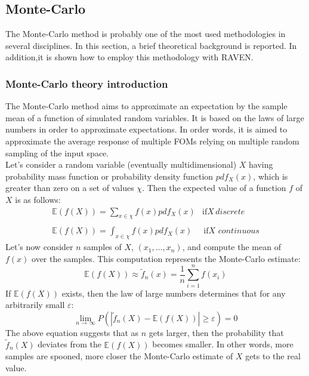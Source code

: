 \subsection{Monte-Carlo}
\label{sub:MC}
The Monte-Carlo method is probably one of the most used methodologies in several disciplines. In this section, a brief theoretical 
background is reported. In addition,it is shown how to employ this methodology with RAVEN.
\subsubsection{Monte-Carlo theory introduction}
\label{subsub:MCtheory}
The Monte-Carlo method aims to approximate an expectation by the sample mean of a function of 
simulated random variables. It is based on the laws of large numbers in order to approximate expectations. 
In order words, it is aimed to approximate the average response of multiple FOMs 
relying on multiple random sampling of the input space. 
\\Let's consider a random variable (eventually multidimensional) $X$ having probability mass function or probability density function $pdf_{X}(x)$,
which is greater than zero on a set of values $\chi$. Then the expected value of a function $f$ of $X$ is as follows:
\begin{equation}
\begin{matrix}
\mathbb{E}(f(X)) =\sum_{x \in \chi} f(x)pdf_{X}(x) & \text{if} X \, discrete \\ 
\\ 
\mathbb{E}(f(X)) =\int_{x \in \chi} f(x)pdf_{X}(x) & \, \text{if} X \, \, continuous
\end{matrix}
\end{equation}
Let's now consider $n$ samples of $X$, $(x_{1},...,x_{n})$, and compute the mean of $f(x)$ over the samples. This computation represents the Monte-Carlo estimate:
\begin{equation}
  \mathbb{E}(f(X)) \approx   \widetilde{f}_{n}(x) = \frac{1}{n} \sum_{i=1}^{n} f(x_{i})  
\end{equation}
If $\mathbb{E}(f(X))$ exists, then the law of large numbers determines that for any arbitrarily small $\varepsilon$:
\begin{equation}
  \lim_{n\rightarrow \, \infty} P( \left | \widetilde{f}_{n}(X) - \mathbb{E}(f(X))  \right |\geq \varepsilon) = 0
\end{equation}
The above equation suggests that as $n$ gets larger, then the probability that $\widetilde{f}_{n}(X)$ deviates 
from the $\mathbb{E}(f(X))$ becomes smaller. In other words, more samples are spooned, more closer the Monte-Carlo estimate of $X$ gets to the real value.
